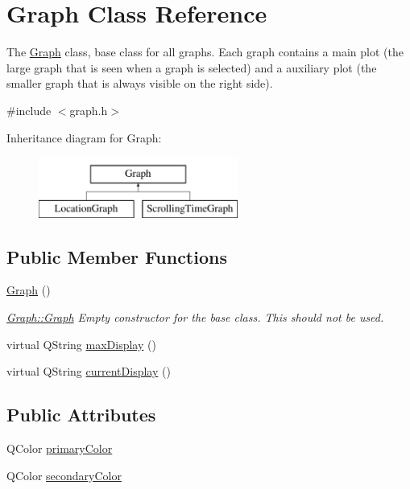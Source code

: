 \hypertarget{class_graph}{}\section{Graph Class Reference}
\label{class_graph}


The \hyperlink{class_graph}{Graph} class, base class for all graphs. Each graph contains a main plot (the large graph that is seen when a graph is selected) and a auxiliary plot (the smaller graph that is always visible on the right side).  




{\ttfamily \#include $<$graph.\+h$>$}

Inheritance diagram for Graph\+:\begin{figure}[H]
\begin{center}
\leavevmode
\includegraphics[height=2.000000cm]{class_graph}
\end{center}
\end{figure}
\subsection*{Public Member Functions}
\begin{DoxyCompactItemize}
\item 
\hyperlink{class_graph_ae4c72b8ac4d693c49800a4c7e273654f}{Graph} ()
\begin{DoxyCompactList}\small\item\em \hyperlink{class_graph_ae4c72b8ac4d693c49800a4c7e273654f}{Graph\+::\+Graph} Empty constructor for the base class. This should not be used. \end{DoxyCompactList}\item 
virtual Q\+String \hyperlink{class_graph_a5102e5e984c2ddebb79b9771b9d37f9f}{max\+Display} ()
\item 
virtual Q\+String \hyperlink{class_graph_a85028910472bc7815ad024ca025bb142}{current\+Display} ()
\end{DoxyCompactItemize}
\subsection*{Public Attributes}
\begin{DoxyCompactItemize}
\item 
Q\+Color \hyperlink{class_graph_ab42ef887ac4d6bad01cc0c2c3609ab6b}{primary\+Color}
\item 
Q\+Color \hyperlink{class_graph_a7bda51c2c124dfe46d5ee515a2508511}{secondary\+Color}
\end{DoxyCompactItemize}
